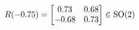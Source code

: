 \documentclass[preview]{standalone}
\begin{document}
\begin{align*}
\special{dvisvgm:raw <g id='unique000'>}R(-0.75) = \begin{bmatrix} 0.73 & 0.68 \\ -0.68 & 0.73 \end{bmatrix} \in \text{SO}(2)\special{dvisvgm:raw </g>}
\end{align*}
\end{document}
